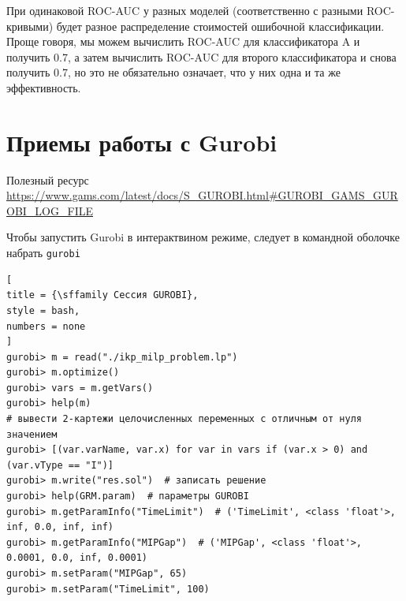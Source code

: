\documentclass[%
	11pt,
	a4paper,
	utf8,
		]{article}
\begin{document}

При одинаковой ROC-AUC у разных моделей (соответственно с разными ROC-кривыми) будет разное распределение стоимостей ошибочной классификации. Проще говоря, мы можем вычислить ROC-AUC для классификатора A и получить 0.7, а затем вычислить ROC-AUC для второго классификатора и снова получить 0.7, но это не обязательно означает, что у них одна и та же эффективность.

\section{Приемы работы с Gurobi}

Полезный ресурс \url{https://www.gams.com/latest/docs/S_GUROBI.html#GUROBI_GAMS_GUROBI_LOG_FILE}

Чтобы запустить Gurobi в интерактвином режиме, следует в командной оболочке набрать \texttt{gurobi}
\begin{lstlisting}[
title = {\sffamily Сессия GUROBI},
style = bash,
numbers = none
]
gurobi> m = read("./ikp_milp_problem.lp")
gurobi> m.optimize()
gurobi> vars = m.getVars()
gurobi> help(m)
# вывести 2-картежи целочисленных переменных с отличным от нуля значением
gurobi> [(var.varName, var.x) for var in vars if (var.x > 0) and (var.vType == "I")]
gurobi> m.write("res.sol")  # записать решение
gurobi> help(GRM.param)  # параметры GUROBI
gurobi> m.getParamInfo("TimeLimit")  # ('TimeLimit', <class 'float'>, inf, 0.0, inf, inf)
gurobi> m.getParamInfo("MIPGap")  # ('MIPGap', <class 'float'>, 0.0001, 0.0, inf, 0.0001)
gurobi> m.setParam("MIPGap", 65)
gurobi> m.setParam("TimeLimit", 100)
\end{lstlisting}
\end{document}
